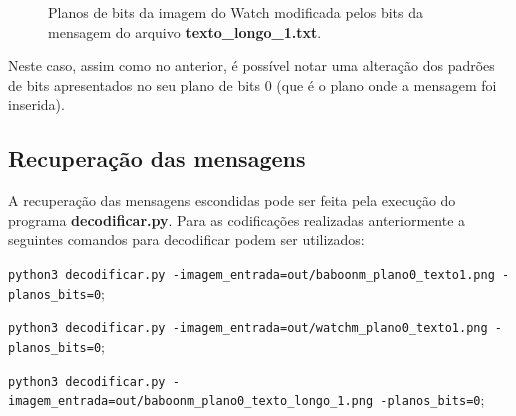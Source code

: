 \documentclass{article}
\begin{document}
\begin{figure}[htp]
	\qquad
	\qquad
	
	\caption{Planos de bits da imagem do Watch modificada pelos bits da mensagem do arquivo \textbf{texto\_longo\_1.txt}.}%
	\label{fig:imagem:plano:watch2}%
\end{figure}

Neste caso, assim como no anterior, é possível notar uma alteração dos padrões de bits apresentados no seu plano de bits 0 (que é o plano onde a mensagem foi inserida).

\subsection{Recuperação das mensagens}
A recuperação das mensagens escondidas pode ser feita pela execução do programa \textbf{decodificar.py}. Para as codificações realizadas anteriormente a seguintes comandos para decodificar podem ser utilizados:

\lstinline{python3 decodificar.py -imagem_entrada=out/baboonm_plano0_texto1.png -planos_bits=0};

\lstinline{python3 decodificar.py -imagem_entrada=out/watchm_plano0_texto1.png -planos_bits=0};

\lstinline{python3 decodificar.py -imagem_entrada=out/baboonm_plano0_texto_longo_1.png -planos_bits=0};
\end{document}
